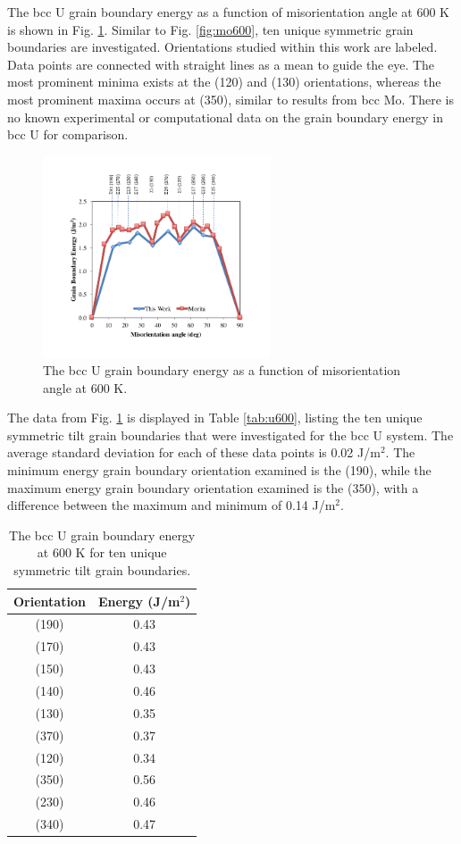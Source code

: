 \documentclass[review]{elsarticle}
\begin{document}
The bcc U grain boundary energy as a function of misorientation angle at 600 K is shown in Fig. \ref{fig:u600}. Similar to Fig. \ref{fig:mo600}, ten unique symmetric grain boundaries are investigated. Orientations studied within this work are labeled. Data points are connected with straight lines as a mean to guide the eye. The most prominent minima exists at the (120) and (130) orientations, whereas the most prominent maxima occurs at (350), similar to results from bcc Mo. There is no known experimental or computational data on the grain boundary energy in bcc U for comparison.

\begin{figure}[h]
 \centering
 \includegraphics[width=0.6\textwidth]{u600B.png} 
 \caption{The bcc U grain boundary energy as a function of misorientation angle at 600 K.}
 \label{fig:u600}
\end{figure}

The data from Fig. \ref{fig:u600} is displayed in Table \ref{tab:u600}, listing the ten unique symmetric tilt grain boundaries that were investigated for the bcc U system. The average standard deviation for each of these data points is 0.02 J/m$^{2}$. The minimum energy grain boundary orientation examined is the (190), while the maximum energy grain boundary orientation examined is the (350), with a difference between the maximum and minimum of 0.14 J/m$^{2}$. 

\begin{table}[h]
\caption{The bcc U grain boundary energy at 600 K for ten unique symmetric tilt grain boundaries.} \label{tab:u600}
\begin{center}
\begin{tabular}{|c|c|}
	\hline
	Orientation & Energy (J/m$^{2}$) \\
	 \hline
	 (190) & 0.43 \\
	 (170) & 0.43 \\
	 (150) & 0.43 \\
	 (140) & 0.46 \\
	 (130) & 0.35 \\	 
	 (370) & 0.37 \\
	 (120) & 0.34 \\
	 (350) & 0.56 \\
	 (230) & 0.46 \\
	 (340) & 0.47 \\
	 \hline
\end{tabular}
\end{center}
\label{default}
\end{table}
\end{document}
